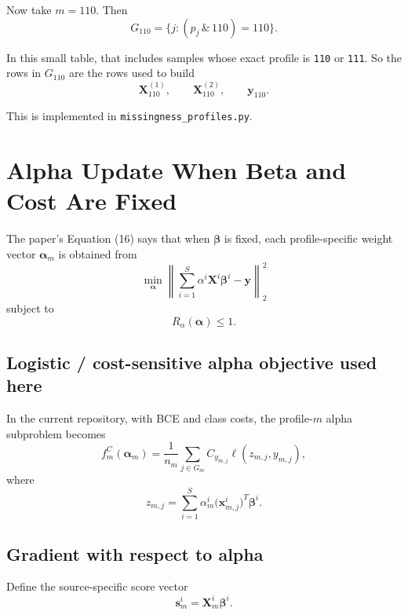 \documentclass[11pt]{article}
\newcommand{\Xm}{\mathbf{X}_m}
\newcommand{\alpham}{\boldsymbol{\alpha}_m}
\newcommand{\betai}{\boldsymbol{\beta}^i}
\newcommand{\betavec}{\boldsymbol{\beta}}
\newcommand{\alphavec}{\boldsymbol{\alpha}}
\begin{document}
Now take $m = 110$. Then
\begin{equation}
\label{eq:g110-example}
G_{110}
=
\{ j : (p_j \,\&\, 110) = 110 \}.
\end{equation}

In this small table, that includes samples whose exact profile is \texttt{110}
or \texttt{111}. So the rows in $G_{110}$ are the rows used to build
\[
\mathbf{X}_{110}^{(1)},
\qquad
\mathbf{X}_{110}^{(2)},
\qquad
\mathbf{y}_{110}.
\]

This is implemented in \texttt{missingness\_profiles.py}.

\section{Alpha Update When Beta and Cost Are Fixed}

The paper's Equation (16) says that when $\betavec$ is fixed, each
profile-specific weight vector $\alpham$ is obtained from
\begin{equation}
\label{eq:paper16}
\min_{\alphavec}
\left\|
\sum_{i=1}^{S} \alpha^i \mathbf{X}^i \betai
- \mathbf{y}
\right\|_2^2
\end{equation}
subject to
\begin{equation}
\label{eq:paper16-constraint}
R_{\alpha}(\alphavec) \le 1.
\end{equation}

\subsection{Logistic / cost-sensitive alpha objective used here}

In the current repository, with BCE and class costs, the profile-$m$ alpha
subproblem becomes
\begin{equation}
\label{eq:alpha-cost-objective}
f_m^C(\alpham)
=
\frac{1}{n_m}
\sum_{j \in G_m}
C_{y_{m,j}}
\ell(z_{m,j}, y_{m,j}),
\end{equation}
where
\begin{equation}
\label{eq:alpha-profile-logit}
z_{m,j}
=
\sum_{i=1}^{S}
\alpha_m^i
\big(\mathbf{x}_{m,j}^i\big)^T
\betai.
\end{equation}

\subsection{Gradient with respect to alpha}

Define the source-specific score vector
\begin{equation}
\label{eq:source-score}
\mathbf{s}_m^i = \Xm^i \betai.
\end{equation}
\end{document}
